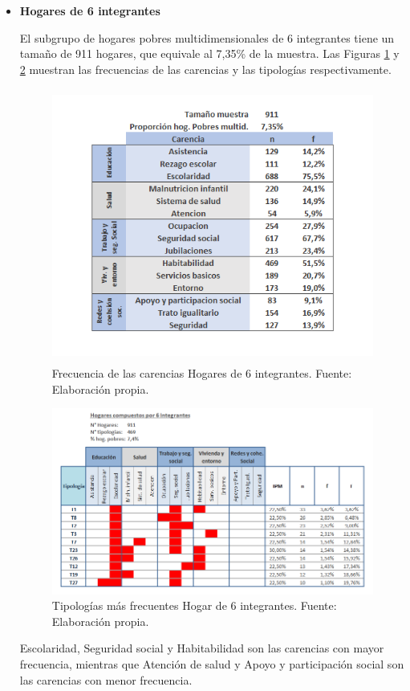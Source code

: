 \documentclass[12pt,letterpaper,spanish]{article}
\begin{document}
\begin{itemize}
    \item \textbf{Hogares de 6 integrantes}
    
    El subgrupo de hogares pobres multidimensionales de 6 integrantes tiene un tamaño de 911 hogares, que equivale al 7,35\% de la muestra. Las Figuras \ref{fren6} y \ref{tipn6} muestran las frecuencias de las carencias y las tipologías respectivamente.
    
    \begin{figure}[H]
        \centering
        \includegraphics[height=9cm]{HOGARES/tabla_num6.png}
        \caption{Frecuencia de las carencias Hogares de 6 integrantes. Fuente: Elaboración propia.}
        \label{fren6}
    \end{figure}
    \begin{figure}[H]
        \centering
        \includegraphics[width=\textwidth]{Mati N/n=6.png}
        \caption{Tipologías más frecuentes Hogar de 6 integrantes. Fuente: Elaboración propia.}
        \label{tipn6}
    \end{figure}
    Escolaridad, Seguridad social y Habitabilidad son las carencias con mayor frecuencia, mientras que Atención de salud y Apoyo y participación social son las carencias con menor frecuencia.
    

\end{itemize}
\end{document}
